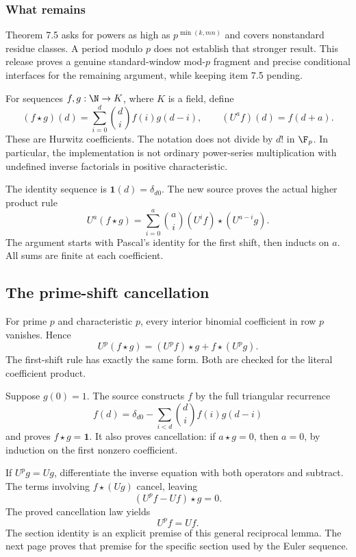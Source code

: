 \subsubsection*{What remains}
Theorem 7.5 asks for powers as high as $p^{\min(k,mn)}$ and covers nonstandard residue classes. A period modulo $p$ does not establish that stronger result. This release proves a genuine standard-window mod-$p$ fragment and precise conditional interfaces for the remaining argument, while keeping item 7.5 pending.

\par\medskip
{}
For sequences $f,g:\N\to K$, where $K$ is a field, define
\[
 (f\star g)(d)=\sum_{i=0}^{d}\binom di f(i)g(d-i),
 \qquad (U^a f)(d)=f(d+a).
\]
These are Hurwitz coefficients. The notation does not divide by $d!$ in $\F_p$. In particular, the implementation is not ordinary power-series multiplication with undefined inverse factorials in positive characteristic.

The identity sequence is $\mathbf1(d)=\delta_{d0}$. The new source proves the actual higher product rule
\[
 U^a(f\star g)=\sum_{i=0}^{a}\binom ai
       (U^i f)\star(U^{a-i}g).
\]
The argument starts with Pascal's identity for the first shift, then inducts on $a$. All sums are finite at each coefficient.

\subsection*{The prime-shift cancellation}
For prime $p$ and characteristic $p$, every interior binomial coefficient in row $p$ vanishes. Hence
\[
 U^p(f\star g)=(U^pf)\star g+f\star(U^pg).
\]
The first-shift rule has exactly the same form. Both are checked for the literal coefficient product.

Suppose $g(0)=1$. The source constructs $f$ by the full triangular recurrence
\[
 f(d)=\delta_{d0}-\sum_{i<d}\binom di f(i)g(d-i)
\]
and proves $f\star g=\mathbf1$. It also proves cancellation: if $a\star g=0$, then $a=0$, by induction on the first nonzero coefficient.

If $U^pg=Ug$, differentiate the inverse equation with both operators and subtract. The terms involving $f\star(Ug)$ cancel, leaving
\[
 (U^pf-Uf)\star g=0.
\]
The proved cancellation law yields
\[
 \boxed{U^pf=Uf.}
\]
The section identity is an explicit premise of this general reciprocal lemma. The next page proves that premise for the specific section used by the Euler sequence.

